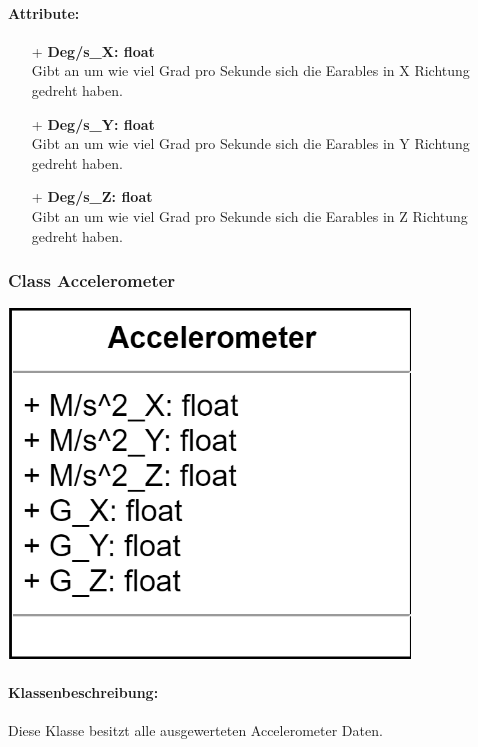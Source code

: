 \documentclass[a4paper,12pt]{article}
\begin{document}
\paragraph{Attribute:}
\begin{itemize}
	\item[+] \textbf{Deg/s\_X: float}\\Gibt an um wie viel Grad pro Sekunde sich die \Gls{Earables} in X Richtung gedreht haben.
	\item[+] \textbf{Deg/s\_Y: float}\\Gibt an um wie viel Grad pro Sekunde sich die \Gls{Earables} in Y Richtung gedreht haben.
	\item[+] \textbf{Deg/s\_Z: float}\\Gibt an um wie viel Grad pro Sekunde sich die \Gls{Earables} in Z Richtung gedreht haben.
\end{itemize}

\begin{minipage}[b]{0.7\textwidth}
	\subsubsection{Class Accelerometer}
	\end{minipage}
	\begin{minipage}[c]{0.3\textwidth}
	\includegraphics[width=0.8\textwidth]{bilder/BibPackageKlassen/Accelerometer.png}
\end{minipage}
\paragraph{Klassenbeschreibung:}
Diese Klasse besitzt alle ausgewerteten Accelerometer Daten.
\end{document}
